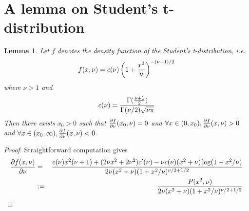 \documentclass[11pt,a4]{amsart}
\newcommand{\pd}{\partial}
\newtheorem{lemma}{Lemma}[section]
\newcommand{\1}{{\mathbf 1}}
\begin{document}
\section{A lemma on Student's t-distribution}
\begin{lemma}
  \label{lemma:II}
  Let $f$ denotes the density function of the Student's
  t-distribution, i.e.
  \[
  f(x; \nu) = c(\nu) \left(
    1 + {x^2 \over \nu}
  \right)^{-(\nu + 1)/2}
  \]
  where $\nu > 1$ and
  \[
  c(\nu) = {
    \Gamma({\nu + 1 \over 2})
    \over
    \Gamma(\nu/2) \sqrt{\nu \pi}
  }
  \]
  Then there exists $x_0 > 0$ such that ${\pd f \over
    \pd \nu}(x_0, \nu) = 0$ and $\forall x \in (0, x_0), {\pd f \over
    \pd \nu}(x, \nu) > 0$ and $\forall x \in (x_0, \infty), {\pd f
    \over \pd \nu}(x, \nu) < 0$.
\end{lemma}
\begin{proof}
  Straightforward computation gives
  \begin{eqnarray}
    {\pd f(x, \nu) \over \pd \nu} &=& {
      c(\nu) x^2 (\nu + 1) + (2 \nu x^2 + 2 \nu^2) c'(\nu)
      -
      \nu c(\nu) (x^2 + \nu) \log(1 + x^2/\nu)
      \over
      2 \nu (x^2 + \nu) (1 + x^2 / \nu)^{\nu/2 + 1/2}
    } \nonumber \\
    &:=& {
      P(x^2, \nu)
      \over
      2 \nu (x^2 + \nu) (1 + x^2 / \nu)^{\nu/2 + 1/2}
    }
    \label{eq:xxie4.1}
  \end{eqnarray}


\end{proof}
\end{document}
